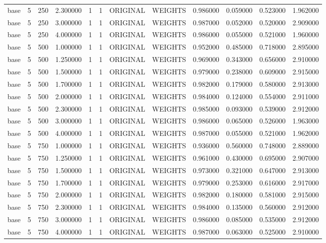 \begin{tabular}{lrrrllllrrrr}
base & 5 & 250 & 2.300000 & 1 & 1 & ORIGINAL & WEIGHTS & 0.986000 & 0.059000 & 0.523000 & 1.962000 \\
base & 5 & 250 & 3.000000 & 1 & 1 & ORIGINAL & WEIGHTS & 0.987000 & 0.052000 & 0.520000 & 2.909000 \\
base & 5 & 250 & 4.000000 & 1 & 1 & ORIGINAL & WEIGHTS & 0.986000 & 0.055000 & 0.521000 & 1.960000 \\
base & 5 & 500 & 1.000000 & 1 & 1 & ORIGINAL & WEIGHTS & 0.952000 & 0.485000 & 0.718000 & 2.895000 \\
base & 5 & 500 & 1.250000 & 1 & 1 & ORIGINAL & WEIGHTS & 0.969000 & 0.343000 & 0.656000 & 2.910000 \\
base & 5 & 500 & 1.500000 & 1 & 1 & ORIGINAL & WEIGHTS & 0.979000 & 0.238000 & 0.609000 & 2.915000 \\
base & 5 & 500 & 1.700000 & 1 & 1 & ORIGINAL & WEIGHTS & 0.982000 & 0.179000 & 0.580000 & 2.913000 \\
base & 5 & 500 & 2.000000 & 1 & 1 & ORIGINAL & WEIGHTS & 0.984000 & 0.124000 & 0.554000 & 2.911000 \\
base & 5 & 500 & 2.300000 & 1 & 1 & ORIGINAL & WEIGHTS & 0.985000 & 0.093000 & 0.539000 & 2.912000 \\
base & 5 & 500 & 3.000000 & 1 & 1 & ORIGINAL & WEIGHTS & 0.986000 & 0.065000 & 0.526000 & 1.963000 \\
base & 5 & 500 & 4.000000 & 1 & 1 & ORIGINAL & WEIGHTS & 0.987000 & 0.055000 & 0.521000 & 1.962000 \\
base & 5 & 750 & 1.000000 & 1 & 1 & ORIGINAL & WEIGHTS & 0.936000 & 0.560000 & 0.748000 & 2.889000 \\
base & 5 & 750 & 1.250000 & 1 & 1 & ORIGINAL & WEIGHTS & 0.961000 & 0.430000 & 0.695000 & 2.907000 \\
base & 5 & 750 & 1.500000 & 1 & 1 & ORIGINAL & WEIGHTS & 0.973000 & 0.321000 & 0.647000 & 2.913000 \\
base & 5 & 750 & 1.700000 & 1 & 1 & ORIGINAL & WEIGHTS & 0.979000 & 0.253000 & 0.616000 & 2.917000 \\
base & 5 & 750 & 2.000000 & 1 & 1 & ORIGINAL & WEIGHTS & 0.982000 & 0.180000 & 0.581000 & 2.915000 \\
base & 5 & 750 & 2.300000 & 1 & 1 & ORIGINAL & WEIGHTS & 0.984000 & 0.135000 & 0.560000 & 2.912000 \\
base & 5 & 750 & 3.000000 & 1 & 1 & ORIGINAL & WEIGHTS & 0.986000 & 0.085000 & 0.535000 & 2.912000 \\
base & 5 & 750 & 4.000000 & 1 & 1 & ORIGINAL & WEIGHTS & 0.987000 & 0.063000 & 0.525000 & 2.910000 \\

\end{tabular}
